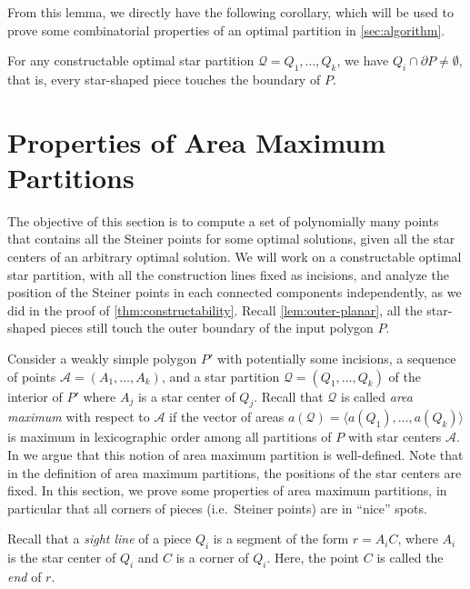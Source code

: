 \documentclass{theoretics}
\begin{document}
From this lemma, we directly have the following corollary, which will be used to prove some combinatorial properties of an optimal partition in \cref{sec:algorithm}. 

\begin{corollary}
    \label{cor:outer-planarity}
    For any constructable optimal star partition $\mathcal{Q} = Q_1, \dots, Q_k$, we have $Q_i \cap \partial P \neq \emptyset$, that is, every star-shaped piece touches the boundary of $P$. 
\end{corollary}




\section{Properties of Area Maximum Partitions}
\label{sec:area-max}

The objective of this section is to compute a set of polynomially many points that contains all the Steiner points for some optimal solutions, given all the star centers of an arbitrary optimal solution. 
We will work on a constructable optimal star partition, with all the construction lines fixed as incisions, and analyze the position of the Steiner points in each connected components independently, as we did in the proof of \cref{thm:constructability}. 
Recall \cref{lem:outer-planar}, all the star-shaped pieces still touch the outer boundary of the input polygon $P$. 

Consider a weakly simple polygon $P'$ with potentially some incisions, a sequence of points $\mathcal A=(A_1,\ldots,A_k)$, and a star partition $\mathcal Q=(Q_1,\ldots,Q_k)$ of the interior of $P'$ where $A_j$ is a star center of $Q_j$.
Recall that $\mathcal Q$ is called \emph{area maximum} with respect to $\mathcal A$ if the vector of areas $a(\mathcal Q)=\langle a(Q_1),\ldots,a(Q_k)\rangle$ is maximum in lexicographic order among all partitions of $P$ with star centers $\mathcal A$.
In  we argue that this notion of area maximum partition is well-defined.
Note that in the definition of area maximum partitions, the positions of the star centers are fixed.
In this section, we prove some properties of area maximum partitions, in particular that all corners of pieces (i.e.\ Steiner points) are in ``nice'' spots.

Recall that a \emph{sight line} of a piece $Q_i$ is a segment of the form $r=A_iC$, where $A_i$ is the star center of $Q_i$ and $C$ is a corner of $Q_i$.
Here, the point $C$ is called the \emph{end} of $r$.
\end{document}
